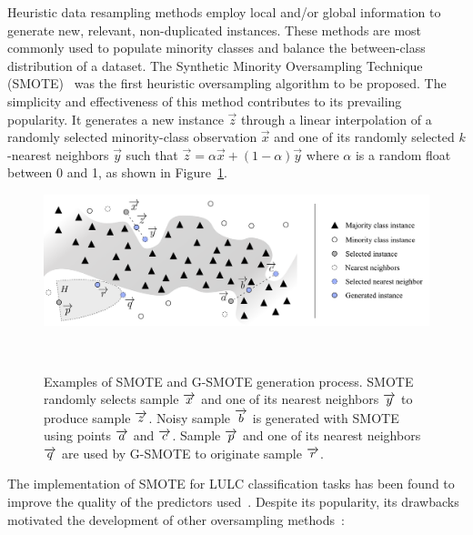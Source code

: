 \documentclass[parskip=full]{scrartcl}
\begin{document}
Heuristic data resampling methods employ local and/or global information to
generate new, relevant, non-duplicated instances. These methods are most
commonly used to populate minority classes and balance the between-class
distribution of a dataset. The Synthetic Minority Oversampling Technique
(SMOTE)~\cite{Chawla2002} was the first heuristic oversampling algorithm to be
proposed. The simplicity and effectiveness of this method contributes to its
prevailing popularity. It generates a new instance $\overrightarrow{z}$ through
a linear interpolation of a randomly selected minority-class observation
$\overrightarrow{x}$ and one of its randomly selected $k$-nearest neighbors
$\overrightarrow{y}$ such that $\overrightarrow{z} = \alpha\overrightarrow{x} +
(1-\alpha)\overrightarrow{y}$ where $\alpha$ is a random float between 0 and 1,
as shown in Figure~\ref{fig:data_generation}. 

\begin{figure}[H]
	\centering
	\includegraphics[width=\linewidth]{../analysis/data_generation}
    \caption{Examples of SMOTE and G-SMOTE generation process. SMOTE randomly
        selects sample $\protect\overrightarrow{x}$ and one of its nearest
        neighbors $\protect\overrightarrow{y}$ to produce sample
        $\protect\overrightarrow{z}$. Noisy sample
        $\protect\overrightarrow{b}$ is generated with SMOTE using points
        $\protect\overrightarrow{a}$ and $\protect\overrightarrow{c}$.  Sample
        $\protect\overrightarrow{p}$ and one of its nearest neighbors
        $\protect\overrightarrow{q}$ are used by G-SMOTE to originate sample
        $\protect\overrightarrow{r}$.
    }~\label{fig:data_generation}
\end{figure}

The implementation of SMOTE for LULC classification tasks has been found to
improve the quality of the predictors used~\cite{Jozdani2019,Bogner2018}.
Despite its popularity, its drawbacks motivated the development of other
oversampling methods~\cite{Douzas2019}:
\end{document}
